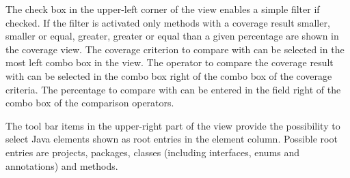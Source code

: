 The check box in the upper-left corner of the view enables a simple filter if checked. If the filter is activated only methods with a coverage result smaller, smaller or equal, greater, greater or equal than a given percentage are shown in the coverage view. The coverage criterion to compare with can be selected in the most left combo box in the view. The operator to compare the coverage result with can be selected in the combo box right of the combo box of the coverage criteria. The percentage to compare with can be entered in the field right of the combo box of the comparison operators.

The tool bar items in the upper-right part of the view provide the possibility to select Java elements shown as root entries in the element column. Possible root entries are projects, packages, classes (including interfaces, enums and annotations) and methods.

